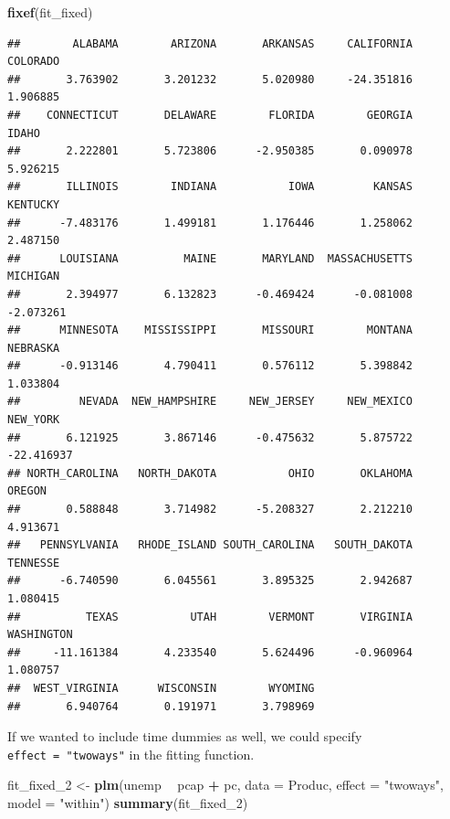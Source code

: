 \documentclass[12pt,oneside,openany]{book}
\newenvironment{Shaded}{\begin{snugshade}}{\end{snugshade}}
\newcommand{\KeywordTok}[1]{\textcolor[rgb]{0.13,0.29,0.53}{\textbf{#1}}}
\newcommand{\DataTypeTok}[1]{\textcolor[rgb]{0.13,0.29,0.53}{#1}}
\newcommand{\DecValTok}[1]{\textcolor[rgb]{0.00,0.00,0.81}{#1}}
\newcommand{\StringTok}[1]{\textcolor[rgb]{0.31,0.60,0.02}{#1}}
\newcommand{\OperatorTok}[1]{\textcolor[rgb]{0.81,0.36,0.00}{\textbf{#1}}}
\newcommand{\NormalTok}[1]{#1}
\begin{document}
\begin{Shaded}
\begin{Highlighting}[]
\KeywordTok{fixef}\NormalTok{(fit_fixed)}
\end{Highlighting}
\end{Shaded}

\begin{verbatim}
##        ALABAMA        ARIZONA       ARKANSAS     CALIFORNIA       COLORADO 
##       3.763902       3.201232       5.020980     -24.351816       1.906885 
##    CONNECTICUT       DELAWARE        FLORIDA        GEORGIA          IDAHO 
##       2.222801       5.723806      -2.950385       0.090978       5.926215 
##       ILLINOIS        INDIANA           IOWA         KANSAS       KENTUCKY 
##      -7.483176       1.499181       1.176446       1.258062       2.487150 
##      LOUISIANA          MAINE       MARYLAND  MASSACHUSETTS       MICHIGAN 
##       2.394977       6.132823      -0.469424      -0.081008      -2.073261 
##      MINNESOTA    MISSISSIPPI       MISSOURI        MONTANA       NEBRASKA 
##      -0.913146       4.790411       0.576112       5.398842       1.033804 
##         NEVADA  NEW_HAMPSHIRE     NEW_JERSEY     NEW_MEXICO       NEW_YORK 
##       6.121925       3.867146      -0.475632       5.875722     -22.416937 
## NORTH_CAROLINA   NORTH_DAKOTA           OHIO       OKLAHOMA         OREGON 
##       0.588848       3.714982      -5.208327       2.212210       4.913671 
##   PENNSYLVANIA   RHODE_ISLAND SOUTH_CAROLINA   SOUTH_DAKOTA       TENNESSE 
##      -6.740590       6.045561       3.895325       2.942687       1.080415 
##          TEXAS           UTAH        VERMONT       VIRGINIA     WASHINGTON 
##     -11.161384       4.233540       5.624496      -0.960964       1.080757 
##  WEST_VIRGINIA      WISCONSIN        WYOMING 
##       6.940764       0.191971       3.798969
\end{verbatim}

If we wanted to include time dummies as well, we could specify
\texttt{effect\ =\ "twoways"} in the fitting function.

\begin{Shaded}
\begin{Highlighting}[]
\NormalTok{fit_fixed_}\DecValTok{2}\NormalTok{ <-}\StringTok{ }\KeywordTok{plm}\NormalTok{(unemp }\OperatorTok{~}\StringTok{ }\NormalTok{pcap }\OperatorTok{+}\StringTok{ }\NormalTok{pc,}
                   \DataTypeTok{data =}\NormalTok{ Produc,}
                   \DataTypeTok{effect =} \StringTok{"twoways"}\NormalTok{,}
                   \DataTypeTok{model =} \StringTok{"within"}\NormalTok{)}
\KeywordTok{summary}\NormalTok{(fit_fixed_}\DecValTok{2}\NormalTok{)}
\end{Highlighting}
\end{Shaded}
\end{document}
